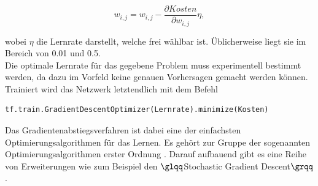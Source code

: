 \begin{equation}
w_{i,j}=w_{i,j}-\frac{\partial Kosten }{\partial w_{i,j}}\eta,
\end{equation}

wobei $\eta$ die Lernrate darstellt, welche frei w\"ahlbar ist. \"Ublicherweise liegt sie im Bereich von 0.01 und 0.5.\\
Die optimale Lernrate f\"ur das gegebene Problem muss experimentell bestimmt werden, da dazu im Vorfeld keine genauen Vorhersagen gemacht werden können.
Trainiert wird das Netzwerk letztendlich mit dem Befehl \cite{building}

\vspace{0.3cm}
\begin{lstlisting}
tf.train.GradientDescentOptimizer(Lernrate).minimize(Kosten)
\end{lstlisting}

Das Gradientenabstiegsverfahren ist dabei eine der einfachsten Optimierungsalgorithmen für das Lernen. Es gehört zur Gruppe der sogenannten Optimierungsalgorithmen erster Ordnung \cite{Goodfellow}. Darauf aufbauend gibt es eine Reihe von Erweiterungen wie zum Beispiel den $\glqq$Stochastic Gradient Descent$\grqq$ \cite{Goodfellow}.